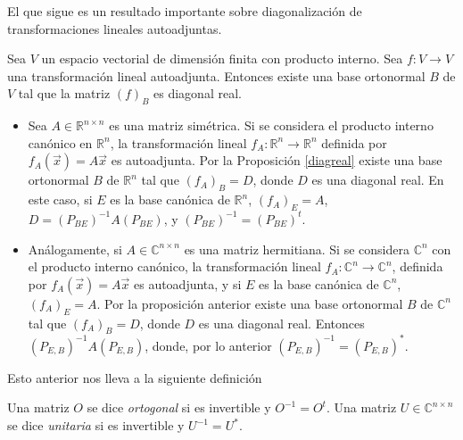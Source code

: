 {\bigskip

El que sigue es un resultado importante sobre diagonalización de transformaciones lineales autoadjuntas.

\bigskip

\begin{theorem}
\label{diagreal}
Sea $V$ un espacio vectorial  de dimensión finita con producto interno. Sea $f: V \rightarrow V$ una transformación lineal autoadjunta. Entonces existe una base ortonormal $B$ de $V$  tal que la matriz $(f)_B$ es diagonal real.

\end{theorem}

\bigskip


\begin{remark}
 \begin{itemize}
     \item 
 Sea $A \in \mathbb{R}^{n \times  n  }$ es una matriz simétrica. Si se considera el producto interno canónico en $\mathbb{R}^{n}$, la transformación lineal $f_A: \mathbb{R}^{n}\rightarrow  \mathbb{R}^{n}$ definida por $f_A(\vec{x})=A\vec{x}$ es autoadjunta. Por la Proposición \ref{diagreal}  existe una base ortonormal $B$ de $\mathbb{R}^{n}$ tal que $(f_A )_B=D$, donde $D$ es una diagonal real. En este caso, si $E$ es la base canónica de $\mathbb{R}^{n}$, $(f_A )_E=A$,  $D= (P_{BE})^{-1}A(P_{BE})$, y  $(P_{BE})^{-1}=(P_{BE})^{t}$.
\item 
Análogamente, si    $A \in \mathbb{C}^{n \times  n  }$  es una matriz hermitiana. Si se considera $\mathbb{C}^{n}$ con   el producto interno canónico, la transformación lineal $f_A: \mathbb{C}^{n}\rightarrow  \mathbb{C}^{n}$,  definida por $f_A(\vec{x})=A\vec{x}$ es autoadjunta, y si $E$ es la base canónica de $\mathbb{C}^{n}$, $(f_A )_E=A$.
Por la proposición anterior  existe una base ortonormal $B$ de $\mathbb{C}^{n}$ tal que $(f_A )_B=D$, donde $D$ es una diagonal real. 
Entonces $ (P_{E,B})^{-1}A(P_{E,B})$, donde, por lo anterior $(P_{E,B})^{-1}=(P_{E,B})^{*}$.
\end{itemize}
\end{remark} 
\bigskip




Esto anterior nos lleva a la siguiente definición

\bigskip

\begin{definition} 
\label{Matriz ortogonal}
Una matriz $O$ se dice \textit{ortogonal } si es invertible y $O^{-1}=O^{t}$.
Una matriz $U\in \mathbb{C}^{n \times  n  }$ se dice \textit{unitaria } si  es invertible y $U^{-1}=U^{*}$.
\end{definition} 


}
